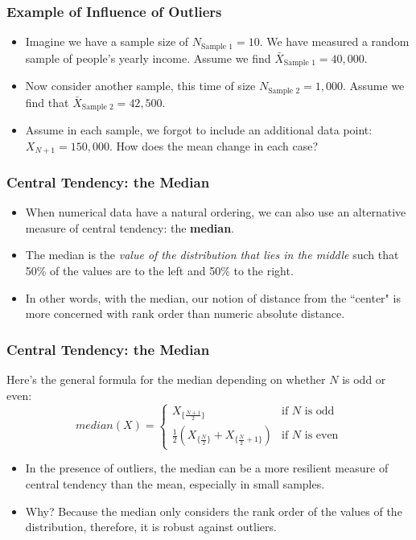 \documentclass[handout]{beamer} %
\begin{document}
\begin{frame}
\frametitle{Example of Influence of Outliers}
\begin{itemize}
\item Imagine we have a sample size of $N_{\text{Sample 1}}=10$. We have measured a random sample of people’s yearly income. Assume we find $\bar{X}_{\text{Sample 1}} = 40,000$. 
\item Now consider another sample, this time of size $N_{\text{Sample 2}} = 1,000$. Assume we find that $\bar{X}_{\text{Sample 2}} = 42,500$.
\item Assume in each sample, we forgot to include an additional data point: $X_{N+1} = 150,000$. How does the mean change in each case?
\end{itemize}
\end{frame}

\begin{frame}
\frametitle{Central Tendency: the Median}
\begin{itemize}
\item When numerical data have a natural ordering, we can also use an alternative measure of central tendency: the \textbf{median}. \pause %
\item The median is the \emph{value of the distribution that lies in the middle} such that 50\% of the values are to the left and 50\% to the right. \pause %
\item In other words, with the median, our notion of distance from the ``center" is more concerned with rank order than numeric absolute distance.
\end{itemize}
\end{frame}

\begin{frame}
\frametitle{Central Tendency: the Median}

Here’s the general formula for the median depending on whether $N$ is odd or even:
\begin{equation*}
median(X) = 
\begin{cases} 
X_{\{\frac{N+1}{2}\}} & \text{if $N$ is odd} \\
\frac{1}{2}(X_{\{\frac{N}{2}\}} + X_{\{\frac{N}{2} + 1\}}) & \text{if $N$ is even}
\end{cases}
\end{equation*}


\begin{itemize}
\item In the presence of outliers, the median can be a more resilient measure of central tendency than the mean, especially in small samples.
\item Why? Because the median only considers the rank order of the values of the distribution, therefore, it is robust against outliers.
\end{itemize}

\end{frame}
\end{document}
